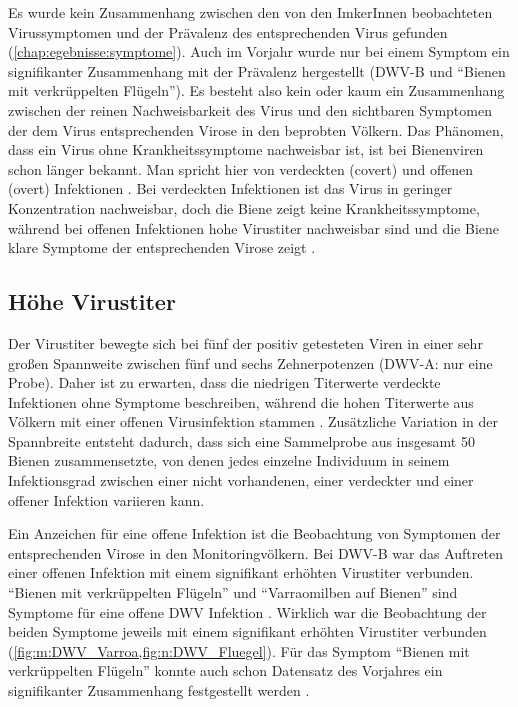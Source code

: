 Es wurde kein Zusammenhang zwischen den von den ImkerInnen beobachteten Virussymptomen und der Prävalenz des entsprechenden Virus gefunden (\cref{chap:egebnisse:symptome}). Auch im Vorjahr wurde nur bei einem Symptom ein signifikanter Zusammenhang mit der Prävalenz hergestellt (DWV-B und \enquote{Bienen mit verkrüppelten Flügeln}). Es besteht also kein oder kaum ein Zusammenhang zwischen der reinen Nachweisbarkeit des Virus und den sichtbaren Symptomen der dem Virus entsprechenden Virose in den beprobten Völkern. Das Phänomen, dass ein Virus ohne Krankheitssymptome nachweisbar ist, ist bei Bienenviren schon länger bekannt. Man spricht hier von verdeckten (covert) und offenen (overt) Infektionen \citep{yue2007}. Bei verdeckten Infektionen ist das Virus in geringer Konzentration nachweisbar, doch die Biene zeigt keine Krankheitssymptome, während bei offenen Infektionen hohe Virustiter nachweisbar sind und die Biene klare Symptome der entsprechenden Virose zeigt \citep{schurr2019,zioni2011}.


\subsection{Höhe Virustiter}

Der Virustiter bewegte sich bei fünf der positiv getesteten Viren in einer sehr großen Spannweite zwischen fünf und sechs Zehnerpotenzen (DWV-A: nur eine Probe). Daher ist zu erwarten, dass die niedrigen Titerwerte verdeckte Infektionen ohne Symptome beschreiben, während die hohen Titerwerte aus Völkern mit einer offenen Virusinfektion stammen \citep{amiri2015,schurr2019}. Zusätzliche Variation in der Spannbreite entsteht dadurch, dass sich eine Sammelprobe aus insgesamt 50 Bienen zusammensetzte, von denen jedes einzelne Individuum in seinem Infektionsgrad zwischen einer nicht vorhandenen, einer verdeckter und einer offener Infektion variieren kann.


Ein Anzeichen für eine offene Infektion ist die Beobachtung von Symptomen der entsprechenden Virose in den Monitoringvölkern. Bei DWV-B war das Auftreten einer offenen Infektion mit einem signifikant erhöhten Virustiter verbunden. \enquote{Bienen mit verkrüppelten Flügeln} und \enquote{Varraomilben auf Bienen} sind Symptome für eine offene DWV Infektion \citep{bowen-walker1999}. Wirklich war die Beobachtung der beiden Symptome jeweils mit einem signifikant erhöhten Virustiter verbunden (\cref{fig:m:DWV_Varroa,fig:n:DWV_Fluegel}). Für das Symptom \enquote{Bienen mit verkrüppelten Flügeln} konnte auch schon Datensatz des Vorjahres ein signifikanter Zusammenhang festgestellt werden \citep{brodschneider2019b}.

